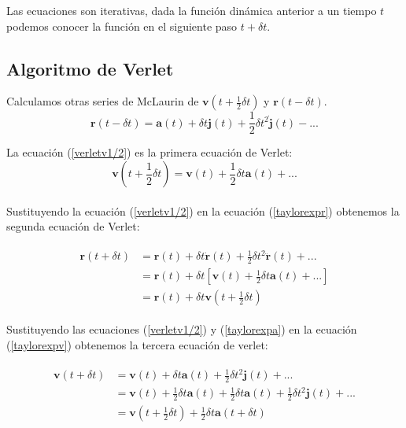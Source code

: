 Las ecuaciones son iterativas, dada la función dinámica anterior a un tiempo $t$ podemos conocer la función en el siguiente paso $t + \delta t$.

\subsection{Algoritmo de Verlet}

Calculamos otras series de McLaurin de $\mathbf{v}(t+\frac{1}{2}\delta t)$ y $\mathbf{r}(t-\delta t)$.\\

\begin{equation}\label{taylorexpr-}
    \mathbf{r}(t - \delta t) = \mathbf{a}(t)+\delta t\mathbf{j}(t) + \frac{1}{2}\delta t^2 \mathbf{\dot{j}}(t)-...
\end{equation}

La ecuación (\ref{verletv1/2}) es la primera ecuación de Verlet:\\
\begin{equation}\label{verletv1/2}
    \mathbf{v}(t + \frac{1}{2}\delta t) = \mathbf{v}(t)+\frac{1}{2}\delta t\mathbf{a}(t) +...
\end{equation}\\

Sustituyendo la ecuación (\ref{verletv1/2}) en la ecuación (\ref{taylorexpr}) obtenemos la segunda ecuación de Verlet:

\begin{align} \label{verletr}
\begin{split}
    \mathbf{r}(t + \delta t) &= \mathbf{r}(t)+\delta t\dot{\mathbf{r}}(t) + \frac{1}{2}\delta t^2 \ddot{\mathbf{r}}(t)+...\\
                             &= \mathbf{r}(t)+\delta t\left[\mathbf{v}(t) + \frac{1}{2}\delta t \mathbf{a}(t)+...\right]\\
                             &= \mathbf{r}(t)+\delta t \mathbf{v}(t+\frac{1}{2}\delta t)
\end{split}
\end{align}

Sustituyendo las ecuaciones (\ref{verletv1/2}) y (\ref{taylorexpa}) en la ecuación (\ref{taylorexpv}) obtenemos la tercera ecuación de verlet:

\begin{align} \label{verletv}
\begin{split}
    \mathbf{v}(t + \delta t) &= \mathbf{v}(t)+\delta t\mathbf{a}(t) + \frac{1}{2}\delta t^2 \mathbf{j}(t)+...\\
                             &= \mathbf{v}(t)+\frac{1}{2}\delta t\mathbf{a}(t) + \frac{1}{2}\delta t\mathbf{a}(t)+ \frac{1}{2}\delta t^2 \mathbf{j}(t)+...\\
                             &= \mathbf{v}(t + \frac{1}{2}\delta t) + \frac{1}{2}\delta t\mathbf{a}(t + \delta t)
\end{split}
\end{align}


